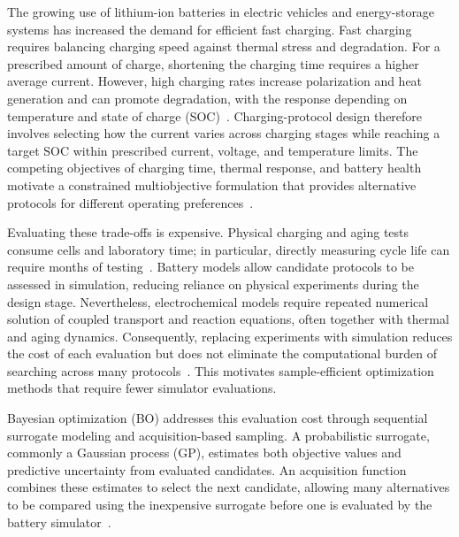 \documentclass[lettersize,journal]{IEEEtran}
\begin{document}
The growing use of lithium-ion batteries in electric vehicles and energy-storage
systems has increased the demand for efficient fast charging. Fast charging
requires balancing charging speed against thermal stress and degradation. For a
prescribed amount of charge, shortening the charging time requires a higher
average current. However, high charging rates increase polarization and heat
generation and can promote degradation, with the response depending on
temperature and state of charge (SOC)~\cite{refFastChargeReview,refTaseDongCharging}.
Charging-protocol design therefore involves selecting how the current varies
across charging stages while reaching a target SOC within prescribed current,
voltage, and temperature limits. The competing objectives of charging time,
thermal response, and battery health motivate a constrained multiobjective
formulation that provides alternative protocols for different operating
preferences~\cite{refTaseYaduCharging,refTaseJiangBRNN,refEIMO}.

Evaluating these trade-offs is expensive. Physical charging and aging tests
consume cells and laboratory time; in particular, directly measuring cycle
life can require months of testing~\cite{nref3}. Battery models allow candidate
protocols to be assessed in simulation, reducing reliance on physical
experiments during the design stage. Nevertheless, electrochemical models
require repeated numerical solution of coupled transport and reaction
equations, often together with thermal and aging dynamics. Consequently,
replacing experiments with simulation reduces the cost of each evaluation but
does not eliminate the computational burden of searching across many
protocols~\cite{refTaseJiangBRNN,refEIMO}. This motivates sample-efficient optimization
methods that require fewer simulator evaluations.

Bayesian optimization (BO) addresses this evaluation cost through sequential
surrogate modeling and acquisition-based sampling. A probabilistic surrogate,
commonly a Gaussian process (GP), estimates both objective values and predictive
uncertainty from evaluated candidates. An acquisition function combines these
estimates to select the next candidate, allowing many alternatives to be
compared using the inexpensive surrogate before one is evaluated by the battery
simulator~\cite{refTaseKimDurability}.
\end{document}
